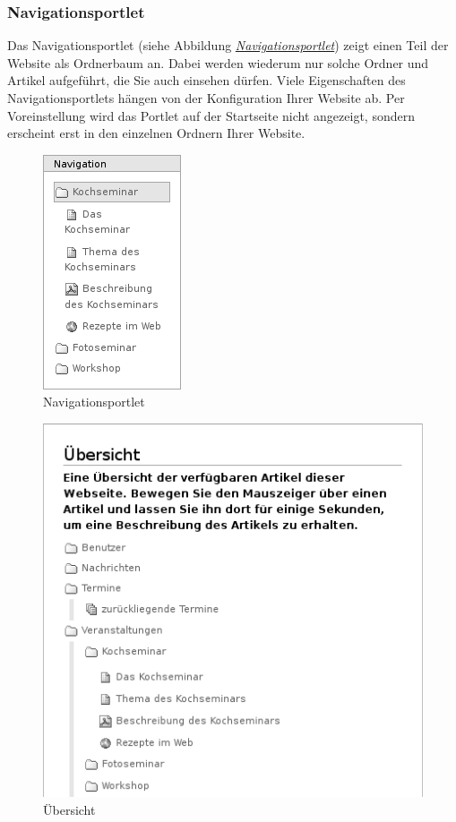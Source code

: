 \documentclass[a4paper,12pt,ngerman]{manual}
\begin{document}
\subsubsection{Navigationsportlet}

Das Navigationsportlet (siehe Abbildung \hyperlink{fig-portlet-navigation}{\emph{Navigationsportlet}})
zeigt einen Teil der Website als Ordnerbaum an. Dabei werden wiederum nur
solche Ordner und Artikel aufgeführt, die Sie auch einsehen dürfen. Viele
Eigenschaften des Navigationsportlets hängen von der Konfiguration Ihrer
Website ab. Per Voreinstellung wird das Portlet auf der Startseite nicht
angezeigt, sondern erscheint erst in den einzelnen Ordnern Ihrer
Website.
\hypertarget{fig-portlet-navigation}{}\begin{figure}[htbp]
\centering

\includegraphics{portlet-navigation.png}
\caption{Navigationsportlet}\end{figure}
\hypertarget{fig-sitemap}{}\begin{figure}[htbp]
\centering

\includegraphics{sitemap.png}
\caption{Übersicht}\end{figure}
\end{document}
